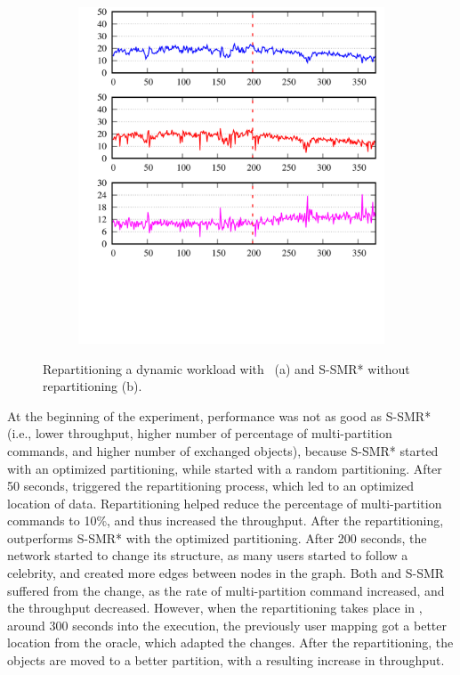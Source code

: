 \begin{figure}[ht!]
\begin{subfigure}{.48\textwidth}
    \includegraphics[width=\textwidth]{./figures/experiments/dynastar/chirper-celeb-ssmr.pdf}
    \caption{}
  \end{subfigure}
  \caption{Repartitioning a dynamic workload with \dynastar~(a) and S-SMR* without repartitioning (b).}%
  \label{fig:socialcelebrity}
\end{figure}

At the beginning of the experiment, \dynastar performance was not as good as
S-SMR* (i.e., lower throughput, higher number of percentage of multi-partition
commands, and higher number of exchanged objects), because S-SMR* started with
an optimized partitioning, while \dynastar started with a random partitioning.
After 50 seconds, \dynastar triggered the repartitioning process, which led to
an optimized location of data. Repartitioning helped reduce the percentage of
multi-partition commands to 10\%, and thus increased the throughput. After the
repartitioning, \dynastar outperforms S-SMR* with the optimized partitioning.
After 200 seconds, the network started to change its structure, as many users
started to follow a celebrity, and created more edges between nodes in the
graph. Both \dynastar and S-SMR suffered from the change, as the rate of
multi-partition command increased, and the throughput decreased. However, when
the repartitioning takes place in \dynastar, around 300 seconds into the
execution, the previously user mapping got a better location from the oracle,
which adapted the changes. After the repartitioning, the objects are moved to a
better partition, with a resulting increase in throughput.

